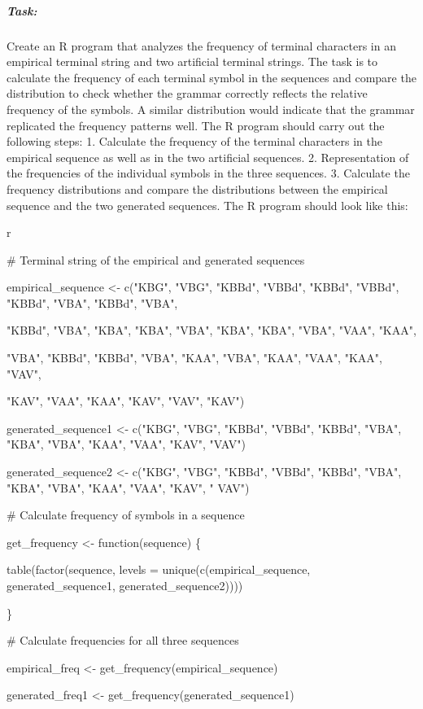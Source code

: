 \documentclass[
]{article}
\begin{document}
\subparagraph{\texorpdfstring{ \textbf{Task:}}{ Task:}}\label{task-7}

Create an R program that analyzes the frequency of terminal characters
in an empirical terminal string and two artificial terminal strings. The
task is to calculate the frequency of each terminal symbol in the
sequences and compare the distribution to check whether the grammar
correctly reflects the relative frequency of the symbols. A similar
distribution would indicate that the grammar replicated the frequency
patterns well. The R program should carry out the following steps: 1.
Calculate the frequency of the terminal characters in the empirical
sequence as well as in the two artificial sequences. 2. Representation
of the frequencies of the individual symbols in the three sequences. 3.
Calculate the frequency distributions and compare the distributions
between the empirical sequence and the two generated sequences. The R
program should look like this:

r

\# Terminal string of the empirical and generated sequences

empirical\_sequence \textless- c("KBG", "VBG", "KBBd", "VBBd", "KBBd",
"VBBd", "KBBd", "VBA", "KBBd", "VBA",

"KBBd", "VBA", "KBA", "KBA", "VBA", "KBA", "KBA", "VBA", "VAA", "KAA",

"VBA", "KBBd", "KBBd", "VBA", "KAA", "VBA", "KAA", "VAA", "KAA", "VAV",

"KAV", "VAA", "KAA", "KAV", "VAV", "KAV")

generated\_sequence1 \textless- c("KBG", "VBG", "KBBd", "VBBd", "KBBd",
"VBA", "KBA", "VBA", "KAA", "VAA", "KAV", "VAV")

generated\_sequence2 \textless- c("KBG", "VBG", "KBBd", "VBBd", "KBBd",
"VBA", "KBA", "VBA", "KAA", "VAA", "KAV", " VAV")

\# Calculate frequency of symbols in a sequence

get\_frequency \textless- function(sequence) \{

table(factor(sequence, levels = unique(c(empirical\_sequence,
generated\_sequence1, generated\_sequence2))))

\}

\# Calculate frequencies for all three sequences

empirical\_freq \textless- get\_frequency(empirical\_sequence)

generated\_freq1 \textless- get\_frequency(generated\_sequence1)
\end{document}
